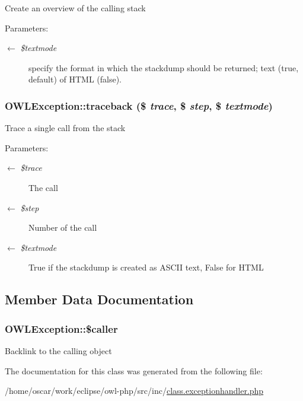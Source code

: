 Create an overview of the calling stack

\begin{Desc}
\item[Parameters:]
\begin{description}
\item[\mbox{$\leftarrow$} {\em \$textmode}]specify the format in which the stackdump should be returned; text (true, default) of HTML (false). \end{description}
\end{Desc}
\hypertarget{classOWLException_6e857cc079ee29428791e4926fe1677a}{
\subsubsection{\setlength{\rightskip}{0pt plus 5cm}OWLException::traceback (\$ {\em trace}, \$ {\em step}, \$ {\em textmode})}}
\label{classOWLException_6e857cc079ee29428791e4926fe1677a}


Trace a single call from the stack

\begin{Desc}
\item[Parameters:]
\begin{description}
\item[\mbox{$\leftarrow$} {\em \$trace}]The call \item[\mbox{$\leftarrow$} {\em \$step}]Number of the call \item[\mbox{$\leftarrow$} {\em \$textmode}]True if the stackdump is created as ASCII text, False for HTML \end{description}
\end{Desc}


\subsection{Member Data Documentation}
\hypertarget{classOWLException_f59d0890c1de1187f43084ec617545f1}{
\subsubsection{\setlength{\rightskip}{0pt plus 5cm}OWLException::\$caller}}
\label{classOWLException_f59d0890c1de1187f43084ec617545f1}


Backlink to the calling object 

The documentation for this class was generated from the following file:\begin{CompactItemize}
\item 
/home/oscar/work/eclipse/owl-php/src/inc/\hyperlink{class_8exceptionhandler_8php}{class.exceptionhandler.php}\end{CompactItemize}
